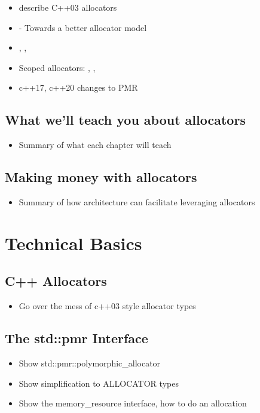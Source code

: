 \begin{itemize}
\item describe C++03 allocators
\item \cite{wg21N1850} - Towards a better allocator model
\item \cite{wg21N2387}, \cite{wg21N2436},
\item Scoped allocators: \cite{wg21N2446}, \cite{wg21N2523}, 
\item c++17, c++20  changes to PMR
\end{itemize}

\subsection{What we'll teach you about allocators}

\begin{itemize}
\item Summary of what each chapter will teach
\end{itemize}

\subsection{Making money with allocators}

\begin{itemize}
\item Summary of how architecture can facilitate leveraging allocators
\end{itemize}

\section{Technical Basics}

\subsection{C++ Allocators}
\begin{itemize}
\item Go over the mess of c++03 style allocator types
\end{itemize}


\subsection{The std::pmr Interface}

\begin{itemize}
\item Show std::pmr::polymorphic\_allocator
\item Show simplification to ALLOCATOR types
\item Show the memory\_resource interface, how to do an allocation
\end{itemize}


